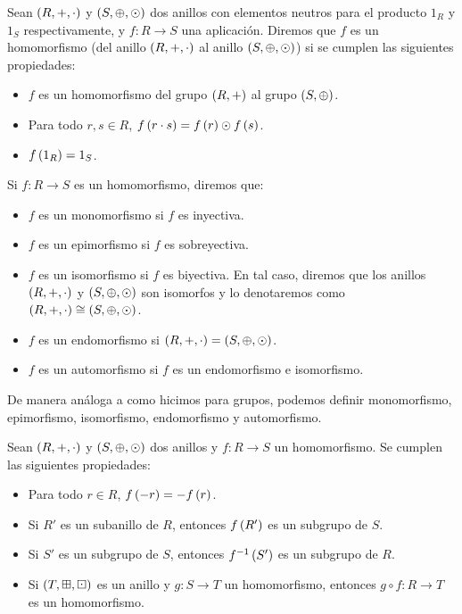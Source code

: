 \begin{definition}
  \rm Sean $\left(R,+,\cdot\right)$ y $\left(S,\oplus,\odot\right)$ dos anillos con elementos neutros para el producto $1_R$ y $1_S$ respectivamente, y $f:R\rightarrow S$ una aplicación. Diremos que $f$ es un homomorfismo (del anillo $\left(R,+,\cdot\right)$ al anillo $\left(S,\oplus,\odot\right)$) si se cumplen las siguientes propiedades:

  \begin{itemize}
    \item[1.] $f$ es un homomorfismo del grupo $\left(R,+\right)$ al grupo $\left(S,\oplus\right)$.
    \item[2.] Para todo $r,s\in R$, $f\left(r\cdot s\right)=f\left(r\right)\odot f\left(s\right)$.
    \item[3.] $f\left(1_R\right)=1_S$.
  \end{itemize}

  Si $f:R\rightarrow S$ es un homomorfismo, diremos que:

  \begin{itemize}
    \item $f$ es un monomorfismo si $f$ es inyectiva.
    \item $f$ es un epimorfismo si $f$ es sobreyectiva.
    \item $f$ es un isomorfismo si $f$ es biyectiva. En tal caso, diremos que los anillos $\left(R,+,\cdot\right)$ y $\left(S,\oplus,\odot\right)$ son isomorfos y lo denotaremos como $\left(R,+,\cdot\right)\cong\left(S,\oplus,\odot\right)$.
    \item $f$ es un endomorfismo si $\left(R,+,\cdot\right)=\left(S,\oplus,\odot\right)$.
    \item $f$ es un automorfismo si $f$ es un endomorfismo e isomorfismo.
  \end{itemize}

  De manera análoga a como hicimos para grupos, podemos definir monomorfismo, epimorfismo, isomorfismo, endomorfismo y automorfismo.
\end{definition}

\begin{proposition}
  \rm Sean $\left(R,+,\cdot\right)$ y $\left(S,\oplus,\odot\right)$ dos anillos y $f:R\rightarrow S$ un homomorfismo. Se cumplen las siguientes propiedades:

  \begin{itemize}
    \item[1.] Para todo $r\in R$, $f\left(-r\right)=-f\left(r\right)$.
    \item[2.] Si $R'$ es un subanillo de $R$, entonces $f\left(R'\right)$ es un subgrupo de $S$.
    \item[3.] Si $S'$ es un subgrupo de $S$, entonces $f^{-1}\left(S'\right)$ es un subgrupo de $R$.
    \item[4.] Si $\left(T, \boxplus , \boxdot\right)$ es un anillo y $g:S\rightarrow T$ un homomorfismo, entonces $g\circ f:R\rightarrow T$ es un homomorfismo. 
  \end{itemize}
\end{proposition}

